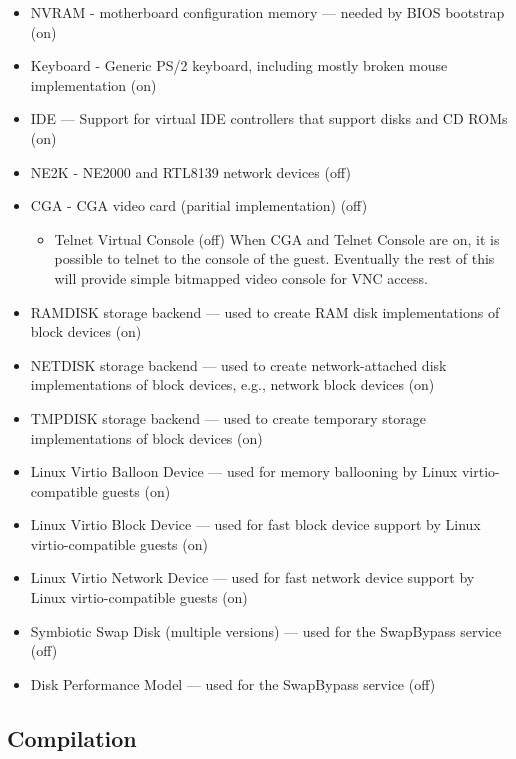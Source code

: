 \documentclass[11pt]{article}
\begin{document}
\begin{itemize}
\begin{itemize}
\item NVRAM - motherboard configuration memory --- needed by BIOS bootstrap (on)
\item Keyboard - Generic PS/2 keyboard, including mostly broken mouse
implementation (on)
\item IDE --- Support for virtual IDE controllers that support disks
and CD ROMs (on)

\item NE2K - NE2000 and RTL8139 network devices (off)
\item CGA - CGA video card (paritial implementation) (off)
\begin{itemize}
\item Telnet Virtual Console (off)   When CGA and Telnet Console are
on, it is possible to telnet to the console of the guest.   Eventually
the rest of this will provide simple bitmapped video console for VNC
access.
\end{itemize}
\item RAMDISK storage backend --- used to create RAM disk
implementations of block devices (on)
\item NETDISK storage backend --- used to create network-attached disk
implementations of block devices, e.g., network block devices (on)
\item TMPDISK storage backend --- used to create temporary storage
implementations of block devices (on)
\item Linux Virtio Balloon Device --- used for memory ballooning by
Linux virtio-compatible guests (on)
\item Linux Virtio Block Device --- used for fast block device support
by Linux virtio-compatible guests (on)
\item Linux Virtio Network Device --- used for fast network device support
by Linux virtio-compatible guests (on) 
\item Symbiotic Swap Disk (multiple versions) --- used for the
SwapBypass service (off)
\item Disk Performance Model --- used for the
SwapBypass service (off)
\end{itemize}
\end{itemize}

\subsection{Compilation}
\end{document}
